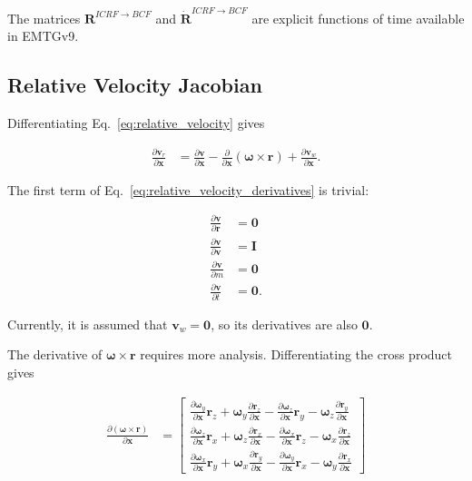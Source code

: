 \documentclass[]{article}
\newcommand{\vb}[1]{\bm{#1}} %
\newcommand{\vbd}[1]{\dot{\bm{#1}}} %
\newcommand{\pd}[2]{\frac{\partial #1}{\partial #2}} %
\begin{document}
\noindent The matrices $\vb{R}^{ICRF \rightarrow BCF}$ and $\vbd{R}^{ICRF \rightarrow BCF}$ are explicit functions of time available in EMTGv9.

\subsection{Relative Velocity Jacobian}
\label{sec:relative_velocity_jacobian}

Differentiating Eq.~\eqref{eq:relative_velocity} gives

\begin{align}
	\label{eq:relative_velocity_derivatives}
	\pd{\vb{v}_r}{\vb{x}} &= \pd{\vb{v}}{\vb{x}} - \pd{}{\vb{x}} \left( \vb{\omega} \times \vb{r} \right) + \pd{\vb{v}_w}{\vb{x}}.
\end{align}

The first term of Eq.~\eqref{eq:relative_velocity_derivatives} is trivial:

\begin{align}
	\pd{\vb{v}}{\vb{r}} &= \vb{0} \\
	\pd{\vb{v}}{\vb{v}} &= \vb{I} \\
	\pd{\vb{v}}{m} &= \vb{0} \\
	\pd{\vb{v}}{t} &= \vb{0}.
\end{align}

Currently, it is assumed that $\vb{v}_w = \vb{0}$, so its derivatives are also $\vb{0}$.

The derivative of $\vb{\omega} \times \vb{r}$ requires more analysis. Differentiating the cross product gives

\begin{align}
	\label{eq:omega_cross_r_derivatives}
	\pd{\left( \vb{\omega} \times \vb{r} \right)}{\vb{x}} &= 
	\left[ \begin{array}{c}
	\pd{\vb{\omega}_y}{\vb{x}} \vb{r}_z + \vb{\omega}_y \pd{\vb{r}_z}{\vb{x}} - \pd{\vb{\omega}_z}{\vb{x}} \vb{r}_y - \vb{\omega}_z \pd{\vb{r}_y}{\vb{x}} \\
	\pd{\vb{\omega}_z}{\vb{x}} \vb{r}_x + \vb{\omega}_z \pd{\vb{r}_x}{\vb{x}} - \pd{\vb{\omega}_x}{\vb{x}} \vb{r}_z - \vb{\omega}_x \pd{\vb{r}_z}{\vb{x}} \\
	\pd{\vb{\omega}_x}{\vb{x}} \vb{r}_y + \vb{\omega}_x \pd{\vb{r}_y}{\vb{x}} - \pd{\vb{\omega}_y}{\vb{x}} \vb{r}_x - \vb{\omega}_y \pd{\vb{r}_x}{\vb{x}}
	\end{array} \right]
\end{align}
\end{document}
